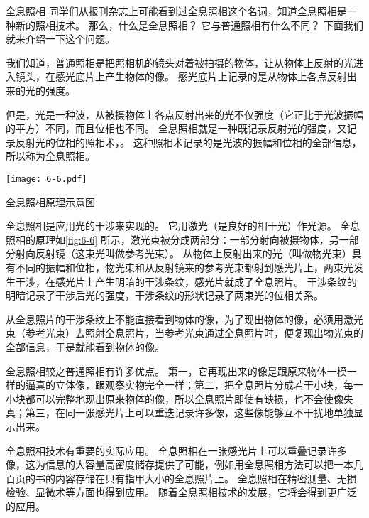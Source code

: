 \begin{Reading}{全息照相}
同学们从报刊杂志上可能看到过全息照相这个名词，知道全息照相是一种新的照相技术。
那么，什么是全息照相？
它与普通照相有什么不同？
下面我们就来介绍一下这个问题。

我们知道，普通照相是把照相机的镜头对着被拍摄的物体，让从物体上反射的光进入镜头，在感光底片上产生物体的像。
感光底片上记录的是从物体上各点反射出来的光的强度。

但是，光是一种波，从被摄物体上各点反射出来的光不仅强度（它正比于光波振幅的平方）不同，而且位相也不同。
全息照相就是一种既记录反射光的强度，又记录反射光的位相的照相术，。
这种照相术记录的是光波的振幅和位相的全部信息，所以称为全息照相。
\begin{figurehere}
  \texttt{[image: 6-6.pdf]}
  \caption{全息照相原理示意图}\label{fig:6-6}
\end{figurehere}

全息照相是应用光的干涉来实现的。
它用激光（是良好的相干光）作光源。
全息照相的原理如\cref{fig:6-6} 所示，激光束被分成两部分：一部分射向被摄物体，另一部分射向反射镜（这束光叫做参考光束）。
从物体上反射出来的光（叫做物光束）具有不同的振幅和位相，物光束和从反射镜来的参考光束都射到感光片上，两束光发生干涉，在感光片上产生明暗的干涉条纹，感光片就成了全息照片。
干涉条纹的明暗记录了干涉后光的强度，干涉条纹的形状记录了两束光的位相关系。

从全息照片的干涉条纹上不能直接看到物体的像，为了现出物体的像，必须用激光束（参考光束）去照射全息照片，当参考光束通过全息照片时，便复现出物光束的全部信息，于是就能看到物体的像。

全息照相较之普通照相有许多优点。
第一，它再现出来的像是跟原来物体一模一样的逼真的立体像，跟观察实物完全一样；第二，把全息照片分成若干小块，每一小块都可以完整地现出原来物体的像，所以全息照片即使有缺损，也不会使像失真；第三，在同一张感光片上可以重迭记录许多像，这些像能够互不干扰地单独显示出来。

全息照相技术有重要的实际应用。
全息照相在一张感光片上可以重叠记录许多像，这为信息的大容量高密度储存提供了可能，例如用全息照相方法可以把一本几百页的书的内容存储在只有指甲大小的全息照片上。
全息照相在精密测量、无损检验、显微术等方面也得到应用。
随着全息照相技术的发展，它将会得到更广泛的应用。
\end{Reading}

